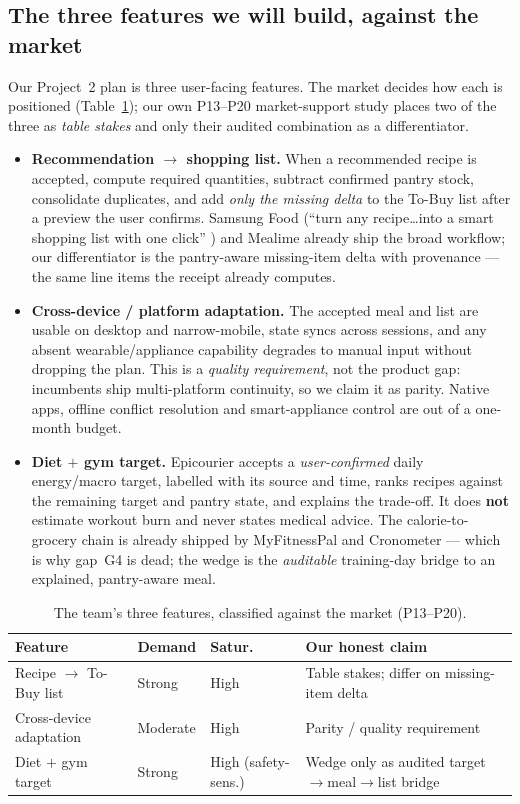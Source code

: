 \documentclass[sigconf,nonacm]{acmart}
\begin{document}
\subsection{The three features we will build, against the market}
Our Project~2 plan is three user-facing features. The market decides how each is
positioned (Table~\ref{tab:features}); our own P13--P20 market-support study places
two of the three as \emph{table stakes} and only their audited combination as a
differentiator.
\begin{itemize}[leftmargin=1.2em]
\item \textbf{Recommendation $\rightarrow$ shopping list.} When a recommended
recipe is accepted, compute required quantities, subtract confirmed pantry stock,
consolidate duplicates, and add \emph{only the missing delta} to the To-Buy list
after a preview the user confirms. Samsung Food (``turn any recipe\ldots into a
smart shopping list with one click'' \cite{sfshop}) and Mealime \cite{mealimeshop}
already ship the broad workflow; our differentiator is the pantry-aware missing-item
delta with provenance --- the same line items the receipt already computes.
\item \textbf{Cross-device / platform adaptation.} The accepted meal and list are
usable on desktop and narrow-mobile, state syncs across sessions, and any absent
wearable/appliance capability degrades to manual input without dropping the plan.
This is a \emph{quality requirement}, not the product gap: incumbents ship
multi-platform continuity, so we claim it as parity. Native apps, offline conflict
resolution and smart-appliance control are out of a one-month budget.
\item \textbf{Diet $+$ gym target.} Epicourier accepts a \emph{user-confirmed}
daily energy/macro target, labelled with its source and time, ranks recipes against
the remaining target and pantry state, and explains the trade-off. It does
\textbf{not} estimate workout burn and never states medical advice. The
calorie-to-grocery chain is already shipped by MyFitnessPal and Cronometer
\cite{mfpex,cronotrain} --- which is why gap~G4 is dead; the wedge is the
\emph{auditable} training-day bridge to an explained, pantry-aware meal.
\end{itemize}

\begin{table}[h]\footnotesize\centering
\caption{The team's three features, classified against the market (P13--P20).}
\label{tab:features}
\begin{tabular}{@{}p{2.3cm}p{1.3cm}p{1.4cm}p{2.2cm}@{}}
\toprule
\textbf{Feature} & \textbf{Demand} & \textbf{Satur.} & \textbf{Our honest claim} \\
\midrule
Recipe $\rightarrow$ To-Buy list & Strong & High & Table stakes; differ on missing-item delta \\
Cross-device adaptation & Moderate & High & Parity / quality requirement \\
Diet $+$ gym target & Strong & High (safety-sens.) & Wedge only as audited target$\rightarrow$meal$\rightarrow$list bridge \\
\bottomrule
\end{tabular}
\end{table}
\end{document}
